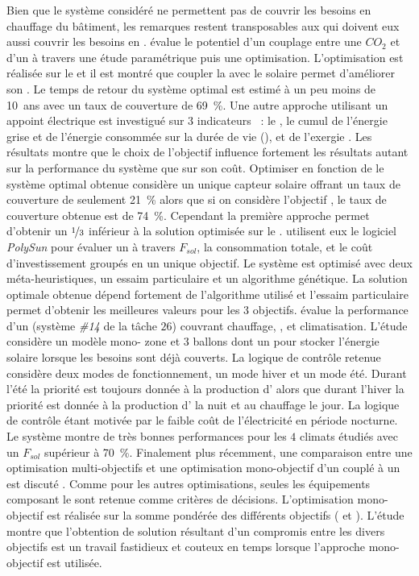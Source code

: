 Bien que le système considéré ne permettent pas de couvrir les besoins en chauffage du
bâtiment, les remarques restent transposables aux  qui doivent eux aussi
couvrir les besoins en .
\textcite{Deng2013212} évalue le potentiel d’un couplage entre une  $CO_{2}$ et
d’un  à travers une étude paramétrique puis une optimisation. L’optimisation est
réalisée sur le  et il est montré que coupler la  avec le
solaire permet d’améliorer son . Le temps de retour du système optimal est estimé
à un peu moins de \SI{10}{ans} avec un taux de couverture de \SI{69}{\percent}. Une autre
approche utilisant un appoint électrique est investigué sur $3$ indicateurs
\parencite{Hin2012,Hin2014102}~:
le , le cumul de l’énergie grise et de l’énergie consommée sur la durée de vie
(), et de l’exergie . Les résultats montre que le choix de l’objectif
influence fortement les résultats autant sur la performance du système que sur son coût.
Optimiser en fonction de  le système optimal obtenue considère un unique capteur
solaire offrant un taux de couverture de seulement \SI{21}{\percent} alors que si on
considère l’objectif , le taux de couverture obtenue est de \SI{74}{\percent}.
Cependant la première approche permet d’obtenir un  $\nicefrac{1}{3}$ inférieur à
la solution optimisée sur le . \textcite{Bornatico201231} utilisent eux le
logiciel \textit{PolySun} pour évaluer un  à travers $F_{sol}$, la
consommation totale, et le coût d’investissement groupés en un unique objectif. Le
système est optimisé avec deux méta-heuristiques, un essaim particulaire et un algorithme
génétique. La solution optimale obtenue dépend fortement de l’algorithme utilisé et
l’essaim particulaire permet d’obtenir les meilleures valeurs pour les $3$ objectifs.
\textcite{Asaee2014510} évalue la performance d’un  (système \emph{\#14} de la tâche
$26$) couvrant chauffage, , et climatisation. L’étude considère un modèle mono-
zone et $3$ ballons dont un pour stocker l’énergie solaire lorsque les besoins sont déjà
couverts. La logique de contrôle retenue considère deux modes de fonctionnement, un mode
hiver et un mode été. Durant l’été la priorité est toujours donnée à la production
d’ alors que durant l’hiver la priorité est donnée à la production d’ la
nuit et au chauffage le jour. La logique de contrôle étant motivée par le faible coût de
l’électricité en période nocturne. Le système montre de très bonnes performances pour les
$4$ climats étudiés avec un $F_{sol}$ supérieur à \SI{70}{\percent}. Finalement
plus récemment, une comparaison entre une optimisation multi-objectifs et une optimisation
mono-objectif d’un  couplé à un  est discuté
\parencite{Rey2016622}. Comme pour les autres optimisations, seules les équipements
composant le  sont retenue comme critères de décisions. L’optimisation mono-
objectif est réalisée sur la somme pondérée des différents objectifs (
et ). L’étude montre que l’obtention de solution résultant d’un compromis entre
les divers objectifs est un travail fastidieux et couteux en temps lorsque l’approche mono-
objectif est utilisée.



